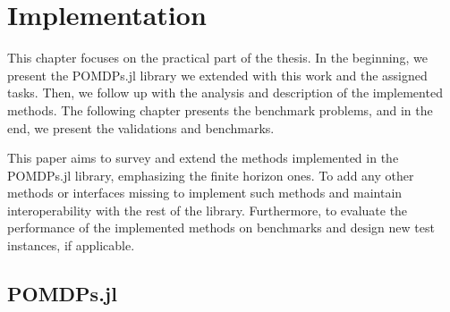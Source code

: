 \chapter{Implementation}

This chapter focuses on the practical part of the thesis. In the beginning, we present the POMDPs.jl library we extended with this work and the assigned tasks. Then, we follow up with the analysis and description of the implemented methods. The following chapter presents the benchmark problems, and in the end, we present the validations and benchmarks.


This paper aims to survey and extend the methods implemented in the POMDPs.jl library, emphasizing the finite horizon ones. To add any other methods or interfaces missing to implement such methods and maintain interoperability with the rest of the library. Furthermore, to evaluate the performance of the implemented methods on benchmarks and design new test instances, if applicable.








\section{POMDPs.jl}

